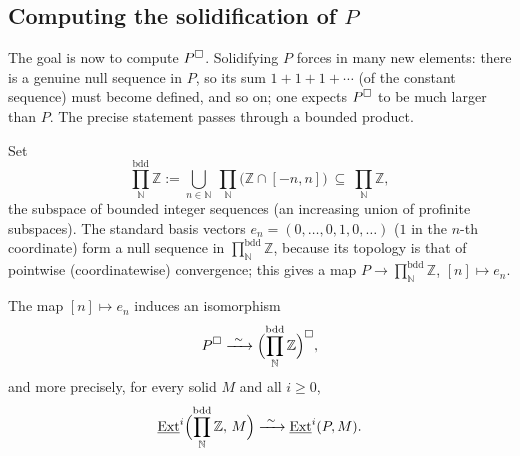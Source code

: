 \subsection{Computing the solidification of \texorpdfstring{$P$}{P}}

The goal is now to compute $P^{\square}$. Solidifying $P$ forces in many new
elements: there is a genuine null sequence in $P$, so its sum $1+1+1+\cdots$ (of
the constant sequence) must become defined, and so on; one expects $P^{\square}$
to be much larger than $P$. The precise statement passes through a bounded
product.

\begin{notation}
\label{not:5:bounded-product}
Set
\begin{equation*}
\prod_{\mathbb{N}}^{\mathrm{bdd}}\mathbb{Z}
:=\bigcup_{n\in\mathbb{N}}\ \prod_{\mathbb{N}}\bigl(\mathbb{Z}\cap[-n,n]\bigr)
\ \subseteq\ \prod_{\mathbb{N}}\mathbb{Z},
\end{equation*}
the subspace of bounded integer sequences (an increasing union of profinite
subspaces). The standard basis vectors $e_n=(0,\dots,0,1,0,\dots)$ ($1$ in the
$n$-th coordinate) form a null sequence in $\prod_{\mathbb{N}}^{\mathrm{bdd}}
\mathbb{Z}$, because its topology is that of pointwise (coordinatewise)
convergence; this gives a map $P\to\prod_{\mathbb{N}}^{\mathrm{bdd}}\mathbb{Z}$,
$[n]\mapsto e_n$.
\end{notation}

\begin{lemma}
\label{lem:5:P-bounded-product}
The map $[n]\mapsto e_n$ induces an isomorphism
\begin{equation*}
P^{\solid}\xrightarrow{\ \sim\ }\Bigl(\prod_{\mathbb{N}}^{\mathrm{bdd}}\mathbb{Z}
\Bigr)^{\solid},
\end{equation*}
and more precisely, for every solid $M$ and all $i\ge0$,
\begin{equation*}
\underline{\operatorname{Ext}}^{i}\Bigl(\prod_{\mathbb{N}}^{\mathrm{bdd}}\mathbb{Z},\,M\Bigr)
\xrightarrow{\ \sim\ }\underline{\operatorname{Ext}}^{i}(P,M).
\end{equation*}
\end{lemma}

